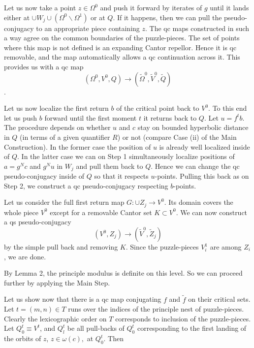  Let us now take a point $z\in \Omega^0$ 
and push it forward
by iterates of $g$ until it lands either at 
$\cup W_j\cup (\Omega^0\backslash \Omega^1)$
or at $Q$. If it happens, 
then we can pull the pseudo-conjugacy to an appropriate piece
containing $z$. The qc maps constructed in such a way agree on the common 
boundaries of the puzzle-pieces. The set of points where this map is not
defined is an expanding Cantor repellor. Hence it is qc removable, and
the  map automatically allows a qc continuation across it.  This provides us
with a qc map 
$$(\Omega^0, V^0, Q)\rightarrow (\tilde \Omega^0, \tilde V^0, \tilde Q)$$.


 Let us now localize the first return $b$
 of the critical  point back to $V^0$. To this end 
let us push $b$ forward 
 until the first moment $t$ it returns back to $Q$. Let $u=f^t b$.
The procedure depends on whether $u$ and $c$ stay on
  bounded hyperbolic distance in $Q$ (in terms of a given quantifier $R$)
  or not (compare Case (ii) of the Main 
  Construction). In the former case the position of $u$ is already 
   well localized inside of $Q$.
   In the latter case  we can on Step 1 simultaneously localize
   positions of $a=g^N c$ and $g^N u$ in $W_j$ and pull them back to $Q$.  
 Hence  we  can change the qc pseudo-conjugacy inside of 
  $Q$ so that it respects $u$-points. Pulling this back as on Step 2, 
  we construct a qc pseudo-conjugacy respecting $b$-points.

 Let us consider the full first  return map
   $G: \cup Z_j\rightarrow V^0$. Its domain covers the whole piece $V^0$
  except for a removable Cantor set $K\subset V^0$. 
  We can now construct a qs pseudo-conjugacy
  $$(V^0, Z_j)\rightarrow (\tilde V^0, \tilde Z_j) $$
  by the simple pull back and removing $K$. Since  the puzzle-pieces
  $V^1_i$ are among $Z_i$, we are done.

By Lemma 2, the principle modulus is definite on this level. 
So we can proceed further by applying the Main Step. 

\medskip{}
Let us show now that there is a qc map conjugating $f$ and $\tilde f$
on their critical sets.  Let $t=(m,n)\in T$ runs over the indices of the
principle nest of puzzle-pieces. Clearly the lexicographic order on $T$
corresponds to inclusion of the puzzle-pieces.
 Let $Q^t_0\equiv V^t$, and $Q^t_l$
be all pull-backs of  $Q^t_0$ corresponding to the first  landing
of the orbits of $z$, $z\in \omega(c),$ at $Q^t_0$. 
Then

